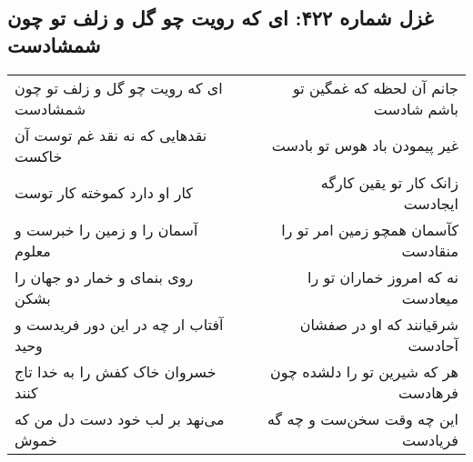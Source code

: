 \begin{center}
\section*{غزل شماره ۴۲۲: ای که رویت چو گل و زلف تو چون شمشادست}
\label{sec:0422}
\begin{longtable}{l p{0.5cm} r}
ای که رویت چو گل و زلف تو چون شمشادست
&&
جانم آن لحظه که غمگین تو باشم شادست
\\
نقدهایی که نه نقد غم توست آن خاکست
&&
غیر پیمودن باد هوس تو بادست
\\
کار او دارد کموخته کار توست
&&
زانک کار تو یقین کارگه ایجادست
\\
آسمان را و زمین را خبرست و معلوم
&&
کآسمان همچو زمین امر تو را منقادست
\\
روی بنمای و خمار دو جهان را بشکن
&&
نه که امروز خماران تو را میعادست
\\
آفتاب ار چه در این دور فریدست و وحید
&&
شرقیانند که او در صفشان آحادست
\\
خسروان خاک کفش را به خدا تاج کنند
&&
هر که شیرین تو را دلشده چون فرهادست
\\
می‌نهد بر لب خود دست دل من که خموش
&&
این چه وقت سخن‌ست و چه گه فریادست
\\
\end{longtable}
\end{center}
